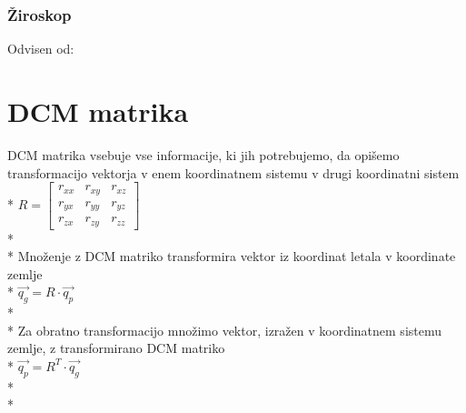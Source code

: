 \documentclass[]{article}
\begin{document}
\subsubsection{Žiroskop}
Odvisen od: 

\clearpage

\section{DCM matrika}

DCM matrika vsebuje vse informacije, ki jih potrebujemo, da opišemo transformacijo vektorja v enem koordinatnem sistemu v drugi koordinatni sistem\\*
$ R = \left[ \begin{array}{ccc}
r_{xx} & r_{xy} & r_{xz} \\ 
r_{yx} & r_{yy} & r_{yz} \\ 
r_{zx} & r_{zy} & r_{zz}
\end{array} \right]  $\\*\\*
Množenje z DCM matriko transformira vektor iz koordinat letala v koordinate zemlje\\*
$ \vec {q_{g}} = R \cdot \vec {q_{p}} $ \\*\\*
Za obratno transformacijo množimo vektor, izražen v koordinatnem sistemu zemlje, z transformirano DCM matriko\\*
$ \vec {q_{p}} = R^{T} \cdot \vec {q_{g}} $\\*\\*
\end{document}
